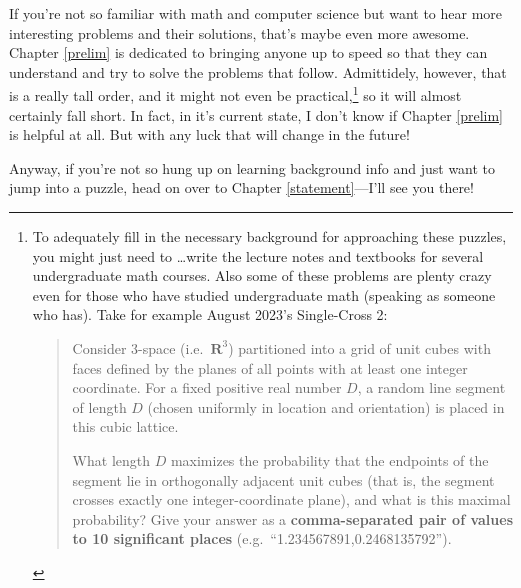 \documentclass{book}
\begin{document}
If you're not so familiar with math and computer science but want to hear more interesting problems and their solutions, that's maybe even more awesome.
Chapter \ref{prelim} is dedicated to bringing anyone up to speed so that they can understand and try to solve the problems that follow. Admittidely, however, that is a really tall order, and it might not even be practical,\footnote{To adequately fill in the necessary background for approaching these puzzles, you might just need to \dots write the lecture notes and textbooks for several undergraduate math courses. Also some of these problems are plenty crazy even for those who have studied undergraduate math (speaking as someone who has). Take for example August 2023's Single-Cross 2:
\begin{quote}
  Consider 3-space (i.e.\ $\mathbf{R}^3$) partitioned into a grid of unit cubes with faces defined by the planes of all points with at least one integer coordinate. For a fixed positive real number $D$, a random line segment of length $D$ (chosen uniformly in location and orientation) is placed in this cubic lattice.

  What length $D$ maximizes the probability that the endpoints of the segment lie in orthogonally adjacent unit cubes (that is, the segment crosses exactly one integer-coordinate plane), and what is this maximal probability? Give your answer as a \textbf{comma-separated pair of values to 10 significant places} (e.g.\ ``1.234567891,0.2468135792'').
\end{quote}} so it will almost certainly fall short. In fact, in it's current state, I don't know if Chapter \ref{prelim} is helpful at all. But with any luck that will change in the future!

Anyway, if you're not so hung up on learning background info and just want to jump into a puzzle, head on over to Chapter \ref{statement}---I'll see you there!
\end{document}
